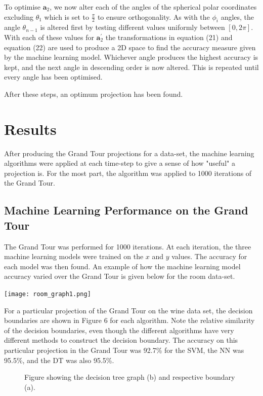 \documentclass[a4paper,11pt,twoside]{article}
\begin{document}
To optimise $\bm{a}_2$, we now alter each of the angles of the spherical polar coordinates excluding $\theta_1$ which is set to $\frac{\pi}{2}$ to ensure orthogonality. As with the $\phi_i$ angles, the angle $\theta_{n-1}$ is altered first by testing different values uniformly between $[0, 2\pi]$. With each of these values for $\bm{a}_2^{\prime}$ the transformations in equation (21) and equation (22) are used to produce a 2D space to find the accuracy measure given by the machine learning model. Whichever angle produces the highest accuracy is kept, and the next angle in descending order is now altered. This is repeated until every angle has been optimised.
\newline

After these steps, an optimum projection has been found.
\newpage
\section{Results}

After producing the Grand Tour projections for a data-set, the machine learning algorithms were applied at each time-step to give a sense of how "useful" a projection is. For the most part, the algorithm was applied to 1000 iterations of the Grand Tour.
\subsection{Machine Learning Performance on the Grand Tour}

The Grand Tour was performed for 1000 iterations. At each iteration, the three machine learning models were trained on the $x$ and $y$ values. The accuracy for each model was then found. An example of how the machine learning model accuracy varied over the Grand Tour is given below for the room data-set.
\begin{center}
\texttt{[image: room\_graph1.png]}

\end{center}

For a particular projection of the Grand Tour on the wine data set, the decision boundaries are shown in Figure 6 for each algorithm. Note the relative similarity of the decision boundaries, even though the different algorithms have very different methods to construct the decision boundary. The accuracy on this particular projection in the Grand Tour was 92.7\% for the SVM, the NN was 95.5\%, and the DT was also 95.5\%.
\begin{figure}[!htb]
    \centering
    \qquad
    \qquad
    \caption{Figure showing the decision tree graph (b) and respective boundary (a).}%
    \label{fig:example}%
\end{figure}
\newpage
\end{document}
